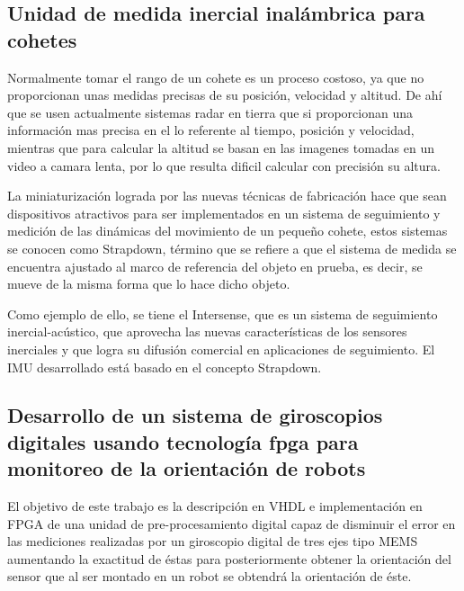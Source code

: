 		\subsection{Unidad de medida inercial inalámbrica para cohetes} 
		
		Normalmente tomar el rango de un cohete es un proceso costoso, ya que no proporcionan unas medidas precisas de su posición, velocidad y altitud. De ahí que se usen actualmente sistemas radar en tierra que si proporcionan una información mas precisa en el lo referente al tiempo, posición y velocidad, mientras que para calcular la altitud se basan en las imagenes tomadas en un video a camara lenta, por lo que resulta dificil calcular con precisión su altura. 
		
		La miniaturización lograda por las nuevas técnicas de fabricación hace que sean dispositivos atractivos para ser implementados en un sistema de seguimiento y medición de las dinámicas del movimiento de un pequeño cohete, estos sistemas se conocen como Strapdown, término que se refiere a que el sistema de medida se encuentra ajustado al marco de referencia del objeto en prueba, es decir, se mueve de la misma forma que lo hace dicho objeto.
		
		Como ejemplo de ello, se tiene el Intersense, que es un sistema de seguimiento inercial-acústico, que aprovecha las nuevas características de los sensores inerciales y que logra su difusión comercial en aplicaciones de seguimiento. El IMU desarrollado está basado en el concepto Strapdown. \cite{Cohete}
		
		
		\subsection{Desarrollo de un sistema de giroscopios digitales usando tecnología fpga para monitoreo de la orientación de robots}

		El objetivo de este trabajo es la descripción en VHDL e implementación en FPGA de una unidad de pre-procesamiento digital capaz de disminuir el error en las mediciones realizadas por un giroscopio digital de tres ejes tipo MEMS aumentando la exactitud de éstas para posteriormente obtener la orientación del sensor que al ser montado en un robot se obtendrá la orientación de éste. 
		
